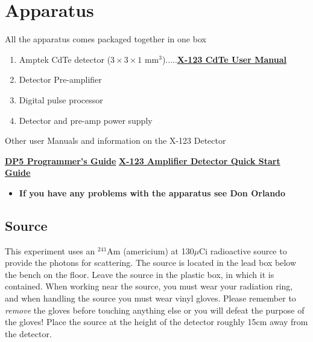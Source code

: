 \documentclass{../lab}
\begin{document}
\section{Apparatus}

All the apparatus comes packaged together in one box

\begin{enumerate}
    \item Amptek CdTe detector ($3 \times 3 \times 1$ mm$^{3}$).....\href{http://experimentationlab.berkeley.edu/sites/default/files/images/X-123\_CdTe\_User\_Manual.pdf}{\textbf{X-123 CdTe User Manual}}

    \item Detector Pre-amplifier

    \item Digital pulse processor

    \item Detector and pre-amp power supply

\end{enumerate}

Other user Manuals and information on the X-123 Detector

\href{http://experimentationlab.berkeley.edu/sites/default/files/images/DP5\_Programmers\_Guide\_A4.pdf}{\textbf{DP5 Programmer's Guide}} \href{http://experimentationlab.berkeley.edu/sites/default/files/images/X-123.pdf}{\textbf{X-123 Amplifier Detector Quick Start Guide}}

\begin{itemize}
    \item \textbf{If you have any problems with the apparatus see Don Orlando}
\end{itemize}

\subsection{Source}

This experiment uses an $^{241}$Am (americium) at 130$\mu$Ci radioactive source to provide the photons for scattering. The source is located in the lead box below the bench on the floor. Leave the source in the plastic box, in which it is contained. When working near the source, you must wear your radiation ring, and when handling the source you must wear vinyl gloves. Please remember to \emph{remove }the gloves before touching anything else or you will defeat the purpose of the gloves! Place the source at the height of the detector roughly 15cm away from the detector.
\end{document}
